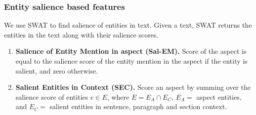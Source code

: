 \documentclass[sigconf,authordraft]{acmart}
\begin{document}
\subsubsection{Entity salience based features}
\label{subsubsec:Entity salience based features}
We use SWAT \cite{swat} to find salience of entities in text. Given a text, SWAT returns the entities in the text along with their salience scores.
\begin{enumerate}
    \item \textbf{Salience of Entity Mention in aspect (Sal-EM).} Score of the aspect is equal to the salience score of the entity mention in the aspect if the entity is salient, and zero otherwise.
    
    \item \textbf{Salient Entities in Context (SEC).} Score an aspect by summing over the salience score of entities $e \in E$, where $E = E_A \cap E_C$, $E_A =$ aspect entities, and $E_C =$ salient entities in sentence, paragraph and section context.
    
    
    

\end{enumerate}
\end{document}
